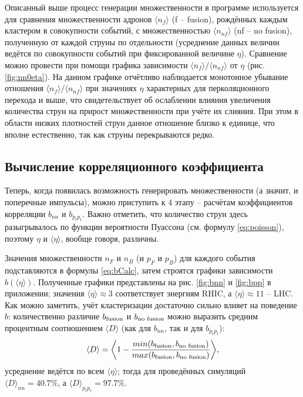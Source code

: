 Описанный выше процесс генерации множественности в программе используется для сравнения множественности адронов $\langle n_{f} \rangle$ (f -- fusion), рождённых каждым кластером в совокупности событий, с множественностью $\langle n_{nf} \rangle$ (nf -- no fusion), полученную от каждой струны по отдельности (усреднение данных величин ведётся по совокупности событий при фиксированной величине $\eta$). 
Сравнение можно провести при помощи графика зависимости $\langle n_{f} \rangle / \langle n_{nf} \rangle$ от $\eta$ (рис. \ref{fig:nn0eta}). 
На данном графике отчётливо наблюдается монотонное убывание отношения $\langle n_{f} \rangle / \langle n_{nf} \rangle$ при значениях $\eta$ характерных для перколяционного перехода и выше, что свидетельствует об ослаблении влияния увеличения количества струн на прирост множественности при учёте их слияния. При этом в области низких плотностей струн данное отношение близко к единице, что вполне естественно, так как струны перекрываются редко.
\subsection{Вычисление корреляционного коэффициента}
Теперь, когда появилась возможность генерировать множественности (а значит, и поперечные импульсы), можно приступить к 4 этапу -- расчётам коэффициентов корреляции $b_{nn}$ и $b_{p_tp_t}$.
Важно отметить, что количество струн здесь разыгрывалось по функции вероятности Пуассона (см. формулу \ref{eq:poisson}), поэтому $\eta$ и $\langle \eta \rangle$, вообще говоря, различны.

Значения множественности $n_F$ и $n_B$ (и $p_F$ и $p_B$) для каждого события подставляются в формулы \ref{eq:bCalc}, затем строятся графики зависимости $b(\langle \eta \rangle)$. Полученные графики представлены на рис. \ref{fig:bnn} и \ref{fig:bpp} в приложении; значения $\langle \eta \rangle \approx 3$ соответствует энергиям RHIC, а $\langle \eta \rangle \approx 11$ -- LHC. 
Как можно заметить, учёт кластеризации достаточно сильно влияет на поведение $b$: количественно различие $b_{\textnormal{fusion}}$ и $b_{\textnormal{no fusion}}$ можно выразить средним процентным соотношением $\langle D \rangle$ (как для $b_{nn}$, так и для $b_{p_tp_t}$):
\begin{equation} \label{eq:bfbn}
	\langle D \rangle = \bigg \langle 1 - \frac{min(b_{\textnormal{fusion}}, b_{\textnormal{no fusion}})}{max(b_{\textnormal{fusion}}, b_{\textnormal{no fusion}})} \bigg \rangle,
\end{equation}
усреднение ведётся по всем $\langle \eta \rangle$; тогда для проведённых симуляций $\langle D \rangle _{nn} = 40.7 \%$, а $\langle D \rangle _{p_tp_t} = 97.7 \%$. 

